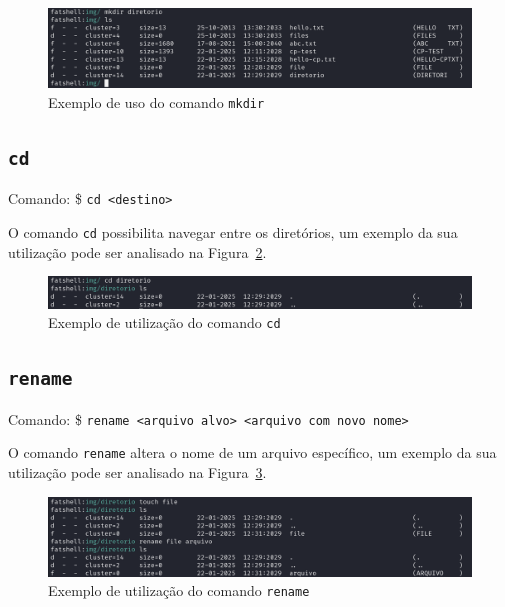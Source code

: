 \documentclass[
    12pt,				%
    oneside,   	        %
    a4paper,			%
    english,			%
    french,				%
    spanish,			%
    brazil,				%
    ]{pacotes/abntex2}
\begin{document}
\begin{figure}[H]
    \centering
    \includegraphics[width=450pt]{figuras/resultados/9-mkdir.PNG}
    \caption{Exemplo de uso do comando \texttt{mkdir}}
    \label{fig:mkdir}
\end{figure}


\subsection{\texttt{cd}}
\label{subsec:cd}
Comando: \$ \texttt{cd <destino>}

O comando \texttt{cd} possibilita navegar entre os diretórios, um exemplo da sua utilização pode ser analisado na Figura~\ref{fig:cd}.
 
\begin{figure}[H]
    \centering
    \includegraphics[width=450pt]{figuras/resultados/10-cd.PNG}
    \caption{Exemplo de utilização do comando \texttt{cd}}
    \label{fig:cd}
\end{figure}


\subsection{\texttt{rename}}
\label{subsec:rename}
Comando: \$ \texttt{rename <arquivo alvo> <arquivo com novo nome>}

O comando \texttt{rename} altera o nome de um arquivo específico, um exemplo da sua utilização pode ser analisado na Figura~\ref{fig:rename}.

\begin{figure}[H]
    \centering
    \includegraphics[width=450pt]{figuras/resultados/11-rename.PNG}
    \caption{Exemplo de utilização do comando \texttt{rename}}
    \label{fig:rename}
\end{figure}
\end{document}
